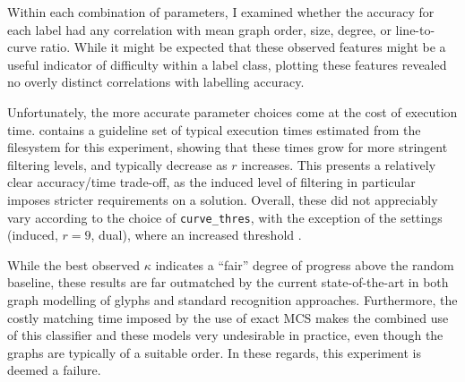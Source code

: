 \documentclass{mpaper}
\begin{document}

Within each combination of parameters, I examined whether the accuracy for each label had any correlation with mean graph order, size, degree, or line-to-curve ratio.
While it might be expected that these observed features might be a useful indicator of difficulty within a label class, plotting these features revealed no overly distinct correlations with labelling accuracy.

Unfortunately, the more accurate parameter choices come at the cost of execution time.
 contains a guideline set of typical execution times estimated from the filesystem for this experiment, showing that these times grow for more stringent filtering levels, and typically decrease as $r$ increases.
This presents a relatively clear accuracy/time trade-off, as the induced level of filtering in particular imposes stricter requirements on a solution.
Overall, these did not appreciably vary according to the choice of \texttt{curve\_thres}, with the exception of the settings (induced, $r=9$, dual), where an increased threshold .

While the best observed $\kappa$ indicates a ``fair'' degree of progress above the random baseline, these results are far outmatched by the current state-of-the-art in both graph modelling of glyphs and standard recognition approaches.
Furthermore, the costly matching time imposed by the use of exact MCS makes the combined use of this classifier and these models very undesirable in practice, even though the graphs are typically of a suitable order.
In these regards, this experiment is deemed a failure.
\end{document}
